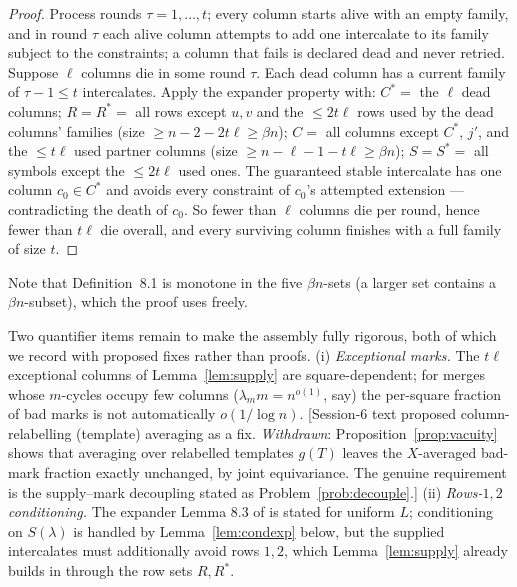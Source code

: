 \begin{proof}
Process rounds $\tau=1,\dots,t$; every column starts alive with an
empty family, and in round $\tau$ each alive column attempts to add
one intercalate to its family subject to the constraints; a column
that fails is declared dead and never retried.  Suppose $\ell$ columns
die in some round $\tau$.  Each dead column has a current family of
$\tau-1\le t$ intercalates.  Apply the expander property with:
$C^*=$ the $\ell$ dead columns; $R=R^*=$ all rows except $u,v$ and the
$\le 2t\ell$ rows used by the dead columns' families (size $\ge
n-2-2t\ell\ge\beta n$); $C=$ all columns except $C^*$, $j'$, and the
$\le t\ell$ used partner columns (size $\ge n-\ell-1-t\ell\ge\beta
n$); $S=S^*=$ all symbols except the $\le2t\ell$ used ones.  The
guaranteed stable intercalate has one column $c_0\in C^*$ and avoids
every constraint of $c_0$'s attempted extension --- contradicting the
death of $c_0$.  So fewer than $\ell$ columns die per round, hence
fewer than $t\ell$ die overall, and every surviving column finishes
with a full family of size $t$.
\end{proof}

Note that Definition~8.1 is monotone in the five $\beta n$-sets (a
larger set contains a $\beta n$-subset), which the proof uses freely.

\begin{remark}\label{rem:bookkeeping}
Two quantifier items remain to make the assembly fully rigorous, both
of which we record with proposed fixes rather than proofs.
(i) \emph{Exceptional marks.}  The $t\ell$ exceptional columns of
Lemma~\ref{lem:supply} are square-dependent; for merges whose
$m$-cycles occupy few columns ($\lambda_m m=n^{o(1)}$, say) the
per-square fraction of bad marks is not automatically $o(1/\log n)$.
[Session-6 text proposed column-relabelling (template) averaging as
a fix.  \emph{Withdrawn}: Proposition~\ref{prop:vacuity} shows that
averaging over relabelled templates $g(T)$ leaves the $X$-averaged
bad-mark fraction exactly unchanged, by joint equivariance.  The
genuine requirement is the supply--mark decoupling stated as
Problem~\ref{prob:decouple}.]
(ii) \emph{Rows-$1,2$ conditioning.}  The expander Lemma 8.3 of
\cite{KPS25} is stated for uniform $L$; conditioning on $S(\lambda)$
is handled by Lemma~\ref{lem:condexp} below, but the supplied
intercalates must additionally avoid rows $1,2$, which
Lemma~\ref{lem:supply} already builds in through the row sets $R,R^*$.
\end{remark}

